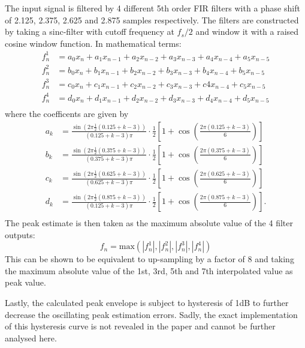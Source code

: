 \documentclass[../main2.tex]{subfiles}
\begin{document}
The input signal is filtered by 4 different 5th order FIR filters with a phase shift of 2.125, 2.375, 2.625 and 2.875 samples respectively. The filters are constructed by taking a sinc-filter with cutoff frequency at $f_s/2$ and window it with a raised cosine window function. In mathematical terms:
\begin{equation}
\begin{split}
f^1_n &= a_0 x_{n} + a_1 x_{n-1} + a_2 x_{n-2} + a_3 x_{n-3} + a_4 x_{n-4} + a_5 x_{n-5} \\
f^2_n &= b_0 x_{n} + b_1 x_{n-1} + b_2 x_{n-2} + b_3 x_{n-3} + b_4 x_{n-4} + b_5 x_{n-5} \\
f^3_n &= c_0 x_{n} + c_1 x_{n-1} + c_2 x_{n-2} + c_3 x_{n-3} + c4 x_{n-4} + c_5 x_{n-5} \\
f^4_n &= d_0 x_{n} + d_1 x_{n-1} + d_2 x_{n-2} + d_3 x_{n-3} + d_4 x_{n-4} + d_5 x_{n-5} \\
\end{split}
\end{equation}
where the coefficents are given by
\begin{equation}
\begin{split}
a_k &= \frac{\sin (2 \pi \frac{1}{2} (0.125+k-3) )}{(0.125+k-3)\pi} \cdot \frac{1}{2}\left[1+\cos \left(\frac{2 \pi (0.125+k-3)}{6} \right) \right] \\
b_k &= \frac{\sin (2 \pi \frac{1}{2} (0.375+k-3) )}{(0.375+k-3)\pi} \cdot \frac{1}{2}\left[1+\cos \left(\frac{2 \pi (0.375+k-3)}{6} \right) \right] \\
c_k &= \frac{\sin (2 \pi \frac{1}{2} (0.625+k-3) )}{(0.625+k-3)\pi} \cdot \frac{1}{2}\left[1+\cos \left(\frac{2 \pi (0.625+k-3)}{6} \right) \right] \\
d_k &= \frac{\sin (2 \pi \frac{1}{2} (0.875+k-3) )}{(0.125+k-3)\pi} \cdot \frac{1}{2}\left[1+\cos \left(\frac{2 \pi (0.875+k-3)}{6} \right) \right]. \\
\end{split}
\end{equation}
The peak estimate is then taken as the maximum absolute value of the 4 filter outputs:
\begin{equation}
f_n = \text{max}(|f^1_n|, |f^2_n|, |f^3_n|, |f^4_n|)
\end{equation}
This can be shown to be equivalent to up-sampling by a factor of 8 and taking the maximum absolute value of the 1st, 3rd, 5th and 7th interpolated value as peak value. 

Lastly, the calculated peak envelope is subject to hysteresis of 1dB to further decrease the oscillating peak estimation errors. Sadly, the exact implementation of this hysteresis curve is not revealed in the paper and cannot be further analysed here.
\end{document}
